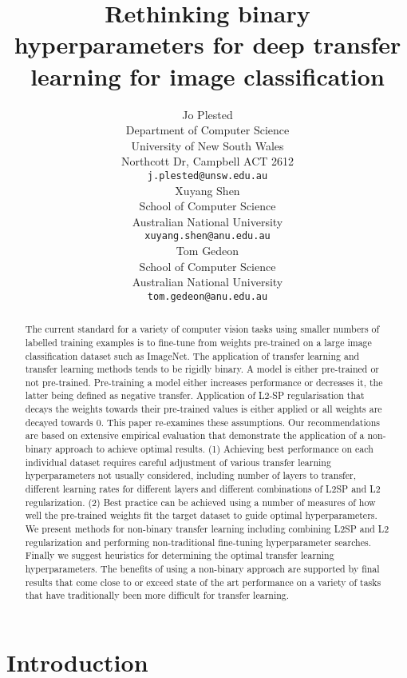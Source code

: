 \documentclass[]{article}
\title{Rethinking binary hyperparameters for deep transfer learning for image classification}
\author{Jo Plested\\
  Department of Computer Science\\
  University of New South Wales\\
  Northcott Dr, Campbell ACT 2612 \\
  \texttt{j.plested@unsw.edu.au} \\
  \And
  Xuyang Shen\\
  School of Computer Science\\
  Australian National University \\
  \texttt{xuyang.shen@anu.edu.au} \\
  \And
  Tom Gedeon\\
  School of Computer Science\\
  Australian National University \\
  \texttt{tom.gedeon@anu.edu.au} \\
}
\begin{document}
\maketitle

\begin{abstract}
 The current standard for a variety of computer vision tasks using
smaller numbers of labelled training examples is to fine-tune from
weights pre-trained on a large image classification dataset such as
ImageNet. The application of transfer learning and transfer learning
methods tends to be rigidly binary. A model is either pre-trained
or not pre-trained. Pre-training a model either increases performance or decreases it, the latter being defined as negative transfer. Application of L2-SP regularisation that decays the weights towards their pre-trained values is either applied or all weights are decayed towards 0. This paper re-examines these assumptions. Our recommendations are based on extensive empirical evaluation that demonstrate the application of a non-binary approach to achieve optimal results. (1) Achieving best performance on each individual dataset requires careful adjustment of various transfer learning hyperparameters not usually considered, including number of layers to transfer, different learning rates for different layers and different combinations of L2SP and L2 regularization. (2) Best practice can be achieved using a number of measures of how well the pre-trained weights fit the target dataset to guide optimal hyperparameters. We present methods for non-binary transfer learning
including combining L2SP and L2 regularization and performing non-traditional fine-tuning hyperparameter searches. Finally we suggest heuristics for determining the optimal transfer learning hyperparameters. The benefits of using a non-binary approach are supported by final results that come close to or exceed state of the art performance on a variety of tasks that have traditionally been more difficult for transfer learning.
\end{abstract}


\section{Introduction}
\end{document}
